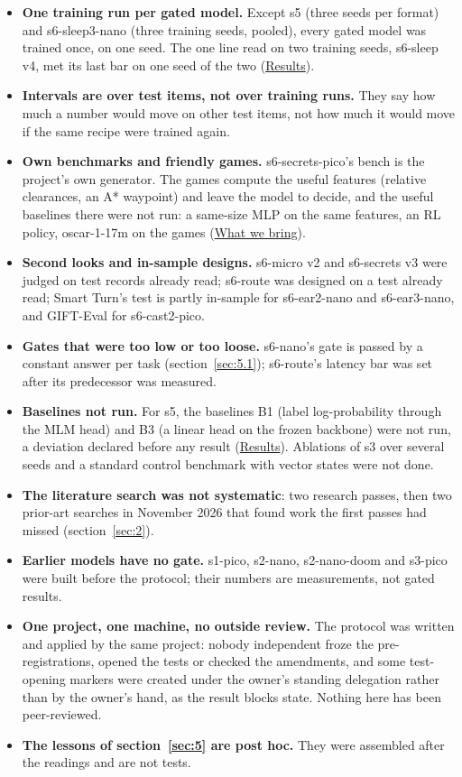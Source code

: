 \documentclass[10pt]{article}
\begin{document}
\begin{itemize}
\item \textbf{One training run per gated model.} Except s5 (three seeds per format) and s6-sleep3-nano (three training seeds, pooled), every gated model was trained once, on one seed. The one line read on two training seeds, s6-sleep v4, met its last bar on one seed of the two (\href{https://maxgfr.github.io/skycmd/results/\#status}{Results}).
\item \textbf{Intervals are over test items, not over training runs.} They say how much a number would move on other test items, not how much it would move if the same recipe were trained again.
\item \textbf{Own benchmarks and friendly games.} s6-secrets-pico's bench is the project's own generator. The games compute the useful features (relative clearances, an A* waypoint) and leave the model to decide, and the useful baselines there were not run: a same-size MLP on the same features, an RL policy, oscar-1-17m on the games (\href{https://maxgfr.github.io/skycmd/novelty/\#what-it-does-not-bring-honestly}{What we bring}).
\item \textbf{Second looks and in-sample designs.} s6-micro v2 and s6-secrets v3 were judged on test records already read; s6-route was designed on a test already read; Smart Turn's test is partly in-sample for s6-ear2-nano and s6-ear3-nano, and GIFT-Eval for s6-cast2-pico.
\item \textbf{Gates that were too low or too loose.} s6-nano's gate is passed by a constant answer per task (section~\ref{sec:5.1}); s6-route's latency bar was set after its predecessor was measured.
\item \textbf{Baselines not run.} For s5, the baselines B1 (label log-probability through the MLM head) and B3 (a linear head on the frozen backbone) were not run, a deviation declared before any result (\href{https://maxgfr.github.io/skycmd/results/\#not-done-yet}{Results}). Ablations of s3 over several seeds and a standard control benchmark with vector states were not done.
\item \textbf{The literature search was not systematic}: two research passes, then two prior-art searches in November 2026 that found work the first passes had missed (section~\ref{sec:2}).
\item \textbf{Earlier models have no gate.} s1-pico, s2-nano, s2-nano-doom and s3-pico were built before the protocol; their numbers are measurements, not gated results.
\item \textbf{One project, one machine, no outside review.} The protocol was written and applied by the same project: nobody independent froze the pre-registrations, opened the tests or checked the amendments, and some test-opening markers were created under the owner's standing delegation rather than by the owner's hand, as the result blocks state. Nothing here has been peer-reviewed.
\item \textbf{The lessons of section~\ref{sec:5} are post hoc.} They were assembled after the readings and are not tests.
\end{itemize}
\end{document}
